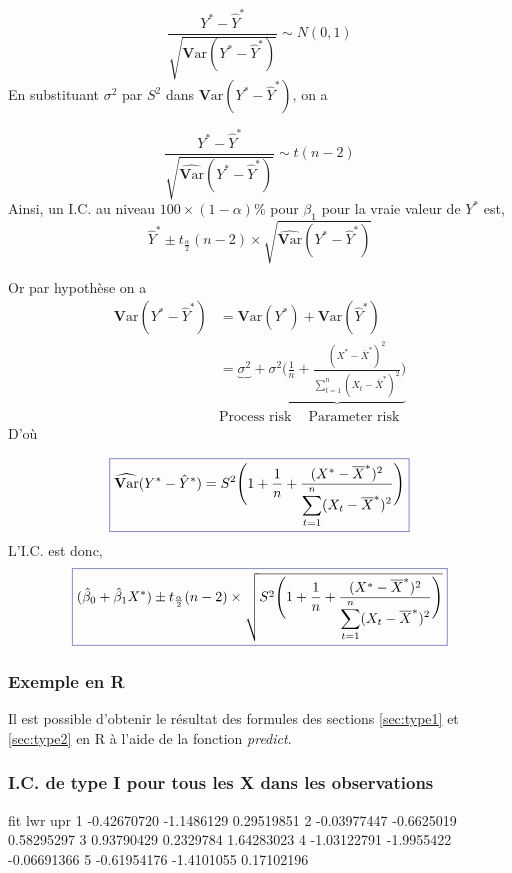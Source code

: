 \documentclass[11pt,french]{report}
\newcommand{\Var}{\mathrm{\textbf{V}ar}}
\begin{document}
$$
\frac{Y^* - \hat{Y}^*}{\sqrt{\Var(Y^* - \hat{Y}^*)}} \sim N(0,1)
$$
En substituant $\sigma^2$ par $S^2$ dans $\Var(Y^* - \hat{Y}^*)$, on a

$$
\frac{Y^* - \hat{Y}^*}{\sqrt{\widehat{\Var}(Y^* - \hat{Y}^*)}} \sim t(n-2)
$$
Ainsi, un I.C. au niveau $100 \times (1 - \alpha)\%$ pour $\beta_1$  pour la vraie valeur de $Y^*$ est,
$$
\hat{Y}^* \pm t_{\frac{\alpha}{2}}(n-2)\times \sqrt{\widehat{\Var}(Y^* - \hat{Y}^*)}
$$

Or par hypothèse on a
\begin{align*}
\Var(Y^* - \hat{Y}^*) &= \Var(Y^*) + \Var(\hat{Y}^*) \\
&= \underbrace{\sigma^2} +\underbrace{\sigma^2\Bigg( \frac{1}{n} + \frac{(X^* - \overline{X}^*)^2}{\displaystyle\sum_{t=1}^n (X_t - \overline{X}^*)^2}\Bigg)}  \\
&   \text{Process risk }\ \ \ \  \text{Parameter risk}
\end{align*}
D'où 

\begin{equation}
\label{eq:var2*}
\color{Blue}
\boxed{\color{black}
\widehat{\Var}(Y^* - \hat{Y}^*) = S^2 \Bigg(1 + \frac{1}{n} + \frac{(X^* - \overline{X}^*)^2}{\displaystyle\sum_{t=1}^n (X_t - \overline{X}^*)^2}\Bigg)  
}
\end{equation}
L'I.C. est donc,
\begin{equation}
\label{eq:IC3}
\color{Blue}
\boxed{\color{black}
(\hat{\beta}_0 + \hat{\beta}_1X^*) \pm t_{\frac{\alpha}{2}}(n-2)\times \sqrt{S^2 \Bigg(1 + \frac{1}{n} + \frac{(X^* - \overline{X}^*)^2}{\displaystyle\sum_{t=1}^n (X_t - \overline{X}^*)^2}\Bigg)}  
}
\end{equation}

\subsubsection*{Exemple en R}
Il est possible d'obtenir le résultat des formules des sections \ref{sec:type1} et \ref{sec:type2} en R à l'aide de la fonction \emph{predict}.

\subsubsection*{I.C. de type I pour tous les X dans les observations}
\begin{Schunk}
\begin{Soutput}
          fit        lwr         upr
1 -0.42670720 -1.1486129  0.29519851
2 -0.03977447 -0.6625019  0.58295297
3  0.93790429  0.2329784  1.64283023
4 -1.03122791 -1.9955422 -0.06691366
5 -0.61954176 -1.4101055  0.17102196
\end{Soutput}
\end{Schunk}
\end{document}
